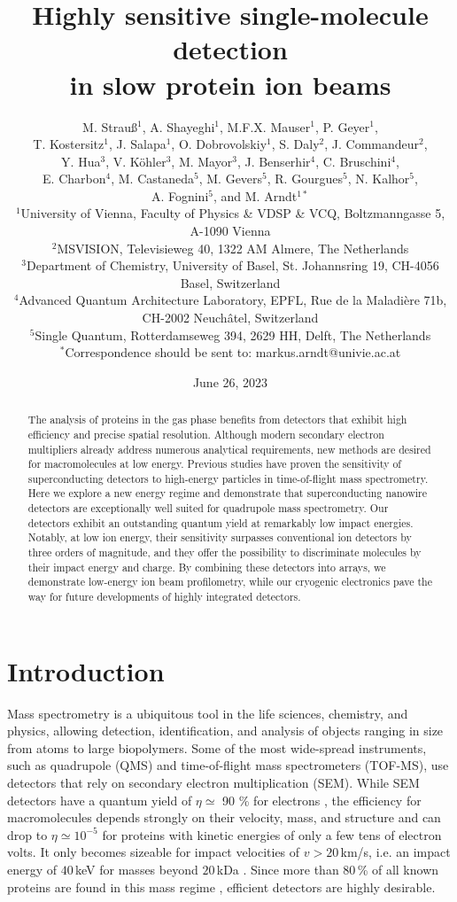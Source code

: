 \documentclass[12pt]{article}
\title{Highly sensitive single-molecule detection \\in slow protein ion beams}
\author{
  M. Strau\ss$^{1}$,
  A. Shayeghi$^{1}$,
  M.F.X. Mauser$^{1}$,
  P. Geyer$^{1}$, \\
  T. Kostersitz$^{1}$,
  J. Salapa$^{1}$,
  O. Dobrovolskiy$^{1}$,
  S. Daly$^{2}$,
  J. Commandeur$^{2}$, \\
  Y. Hua$^{3}$,
  V. Köhler$^{3}$,
  M. Mayor$^{3}$,
  J. Benserhir$^{4}$,
  C. Bruschini$^{4}$, \\
  E. Charbon$^{4}$,
  M. Castaneda$^{5}$,
  M. Gevers$^{5}$,
  R. Gourgues$^{5}$,
  N. Kalhor$^{5}$, \\
  A. Fognini$^{5}$,
  and M. Arndt$^{1\ast}$
  \\[6pt]
  \footnotesize $^{1}$University of Vienna, Faculty of Physics \& VDSP \& VCQ, Boltzmanngasse 5, A-1090 Vienna \\
  \footnotesize $^{2}$MSVISION, Televisieweg 40, 1322 AM Almere, The Netherlands \\
  \footnotesize $^{3}$Department of Chemistry, University of Basel, St. Johannsring 19, CH-4056 Basel, Switzerland \\
  \footnotesize $^{4}$Advanced Quantum Architecture Laboratory, EPFL, Rue de la Maladière 71b, CH-2002 Neuchâtel, Switzerland \\
  \footnotesize $^{5}$Single Quantum, Rotterdamseweg 394, 2629 HH, Delft, The Netherlands \\
  \footnotesize $^\ast$Correspondence should be sent to: markus.arndt@univie.ac.at
}
\date{\footnotesize June 26, 2023}
\begin{document}
 
\maketitle

\begin{abstract}
The analysis of proteins in the gas phase benefits from detectors that exhibit high efficiency and precise spatial resolution. Although modern secondary electron multipliers already address numerous analytical requirements, new methods are desired for macromolecules at low energy. Previous studies have proven the sensitivity of superconducting detectors to high-energy particles in time-of-flight mass spectrometry. Here we explore a new energy regime and demonstrate that superconducting nanowire detectors are exceptionally well suited for quadrupole mass spectrometry. Our detectors exhibit an outstanding quantum yield at remarkably low impact energies. Notably, at low ion energy, their sensitivity surpasses conventional ion detectors by three orders of magnitude, and they offer the possibility to discriminate molecules by their impact energy and charge. By combining these detectors into arrays, we demonstrate low-energy ion beam profilometry, while our cryogenic electronics pave the way for future developments of highly integrated detectors.
\end{abstract} 

\newpage
\section*{Introduction}
Mass spectrometry is a ubiquitous tool in the life sciences, chemistry, and physics, allowing detection, identification, and analysis of objects ranging in size from atoms to large biopolymers. Some of the most wide-spread instruments, such as quadrupole (QMS) \cite{Paul1990} and time-of-flight mass spectrometers (TOF-MS), use detectors that rely on secondary electron multiplication (SEM). While SEM detectors have a quantum yield of $\eta \simeq$ 90 \% for electrons \cite{Fehre2018},  the efficiency for macromolecules depends strongly on their velocity, mass, and structure \cite{Brunelle1997,Beuhler1980} and can drop to $\eta \simeq 10^{-5}$ for proteins with kinetic energies of only a few tens of electron volts.
It only becomes sizeable for impact velocities of $v > 20$\,km/s, i.e. an impact energy of $40$\,keV for masses beyond $20$\,kDa \cite{Twerenbold2001}. Since more than $80\,$\% of all known proteins are found in this mass regime \cite{Berman2003}, efficient detectors are highly desirable. 
\end{document}
